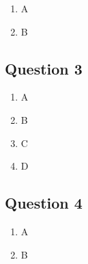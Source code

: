 \documentclass[12pt]{article}
\begin{document}
\begin{enumerate}

\item A
\item B
\end{enumerate}

\subsection*{Question 3}

\begin{enumerate}
\item A

\item B

\item C

\item D
\end{enumerate}

\subsection*{Question 4}
\begin{enumerate}
\item A

\item B
\end{enumerate}
\end{document}
